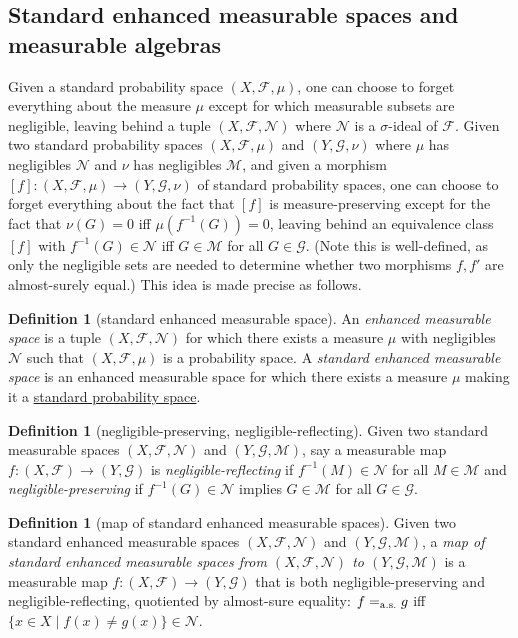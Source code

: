 \documentclass[
  sigconf,
  screen, ]{acmart}
\theoremstyle{definition}
\newtheorem{definition}[theorem]{Definition}
\newcommand\calF{\mathcal F}
\newcommand\calG{\mathcal G}
\newcommand\calM{\mathcal M}
\newcommand\calN{\mathcal N}
\newcommand\nref[2]{\hyperref[#1]{#2}} \newcommand\checkhigh{{\huge{\color{red}\textbf{TODO: check}}}}
\newcommand\aseq{=_{\rm a.s.}}
\begin{document}
\subsection{Standard enhanced measurable spaces and measurable algebras} \label{app:sec:stdmblespc}

Given a standard probability space $(X,\calF,\mu)$,
one can choose to forget everything about the measure $\mu$
except for which measurable subsets are negligible,
leaving behind a tuple $(X,\calF,\calN)$
where $\calN$ is a $\sigma$-ideal of $\calF$.
Given two standard probability spaces $(X,\calF,\mu)$
and $(Y,\calG,\nu)$ where $\mu$ has negligibles $\calN$
and $\nu$ has negligibles $\calM$,
and given a morphism $[f] : (X,\calF,\mu)\to (Y,\calG,\nu)$ of standard probability spaces,
one can choose to forget everything about the fact that $[f]$
is measure-preserving except for the fact that
$\nu(G) = 0$ iff $\mu(f^{-1}(G)) = 0$,
leaving behind an equivalence class
$[f]$ with $f^{-1}(G)\in\calN$ iff $G\in\calM$
for all $G\in\calG$.
(Note this is well-defined, as only the negligible sets
are needed to determine whether two morphisms $f,f'$ are almost-surely equal.)
This idea is made precise as follows.

\begin{definition}[standard enhanced measurable space] \label{app:def:stems}
  An \emph{enhanced measurable space}
  is a tuple $(X,\calF,\calN)$
  for which there exists a measure $\mu$
  with negligibles $\calN$ such that
  $(X,\calF,\mu)$ is a probability space.
  A \emph{standard enhanced measurable space}
  is an enhanced measurable space for which there
  exists a measure $\mu$ making it a \nref{app:def:sps}{standard probability space}.
\end{definition}

\begin{definition}[negligible-preserving, negligible-reflecting] \label{app:def:neg-refl}
  Given two standard measurable spaces
  $(X,\calF,\calN)$ and $(Y,\calG,\calM)$,
  say a measurable map $f : (X,\calF)\to(Y,\calG)$
  is \emph{negligible-reflecting}
  if $f^{-1}(M)\in \calN$
  for all $M\in\calM$
  and \emph{negligible-preserving}
  if $f^{-1}(G)\in\calN$
  implies $G\in\calM$
  for all $G\in\calG$.
\end{definition}

\begin{definition}[map of standard enhanced measurable spaces] \label{app:def:stems-mor}
  Given two standard enhanced measurable spaces
  $(X,\calF,\calN)$ and $(Y,\calG,\calM)$,
  a \emph{map of standard enhanced measurable spaces
  from $(X,\calF,\calN)$ to $(Y,\calG,\calM)$}
  is a measurable map $f : (X,\calF)\to(Y,\calG)$
  that is both negligible-preserving and negligible-reflecting,
  quotiented by almost-sure equality:
  $f\aseq g$ iff $\{x\in X\mid f(x)\ne g(x)\} \in\calN$.
\end{definition}
\end{document}
